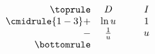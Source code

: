 \[
  \begin{array}{r c @{\hspace*{1.0cm}} c}\toprule
      & D & I \\\cmidrule{1-3}
      + & \ln u & 1 \\
      - & \tfrac1{u} & u \\\bottomrule
  \end{array}
\]